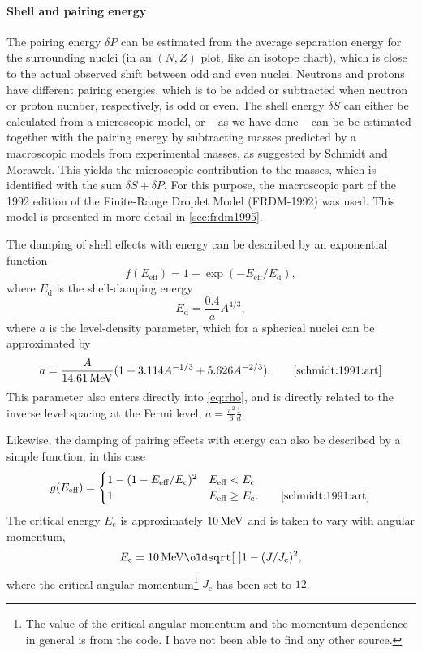 \paragraph{Shell and pairing energy}
The pairing energy $\delta P$ can be estimated from the average separation energy for the surrounding nuclei (in an $(N,Z)$ plot, like an isotope chart), which is close to the actual observed shift between odd and even nuclei\cite{ericson:1960}. Neutrons and protons have different pairing energies, which is to be added or subtracted when neutron or proton number, respectively, is odd or even. 
The shell energy $\delta S$ can either be calculated from a microscopic model, or -- as we have done -- can be be estimated together with the pairing energy by subtracting masses predicted by a macroscopic models from experimental masses, as suggested by Schmidt and Morawek\cite{schmidt:1991:art}. This yields the microscopic contribution to the masses, which is identified with the sum $\delta S + \delta P$. 
For this purpose, the macroscopic part of the 1992 edition of the Finite-Range Droplet Model (FRDM-1992)\cite{moller1995} was used. This model is presented in more detail in \autoref{sec:frdm1995}.

The damping of shell effects with energy can be described by an exponential function
\begin{equation}
f(E_\text{eff}) = 1-\exp{\left(-E_\text{eff}/E_\text{d}\right)},
\end{equation}
where $E_\text{d}$ is the shell-damping energy 
\begin{equation}
E_\text{d} = \frac{0.4}{a} A^{4/3},
\end{equation}
where $a$ is the level-density parameter, which for a spherical nuclei can be approximated by
\begin{equation}
a=\frac{A}{\unit[14.61]{MeV}}(1+3.114 A^{-1/3} + 5.626 A^{-2/3}).\qquad\cite{schmidt:1991:art}\label{eq:a}
\end{equation}
This parameter also enters directly into \eqref{eq:rho}, and is directly related to the inverse level spacing at the Fermi level, $a=\tfrac{\pi^2}{6} \tfrac{1}{d}$.

Likewise, the damping of pairing effects with energy can also be described by a simple function, in this case
\begin{equation}
g(E_\text{eff}) = \begin{cases} 1-(1-E_\text{eff}/E_\text{c})^2 & E_\text{eff} < E_\text{c} \\
 1 & E_\text{eff} \ge E_\text{c}.\qquad\cite{schmidt:1991:art}
\end{cases}
\end{equation}
The critical energy $E_\text{c}$ is approximately $\unit[10]{MeV}$ and is taken to vary with angular momentum, 
\begin{equation}
E_\text{c} = \unit[10]{MeV}\sqrt{1-(J/J_\text{c})^2},
\end{equation}
where the critical angular momentum\footnote{The value of the critical angular momentum and the momentum dependence in general is from the  code. I have not been able to find any other source.} $J_\text{c}$ has been set to $12$.
